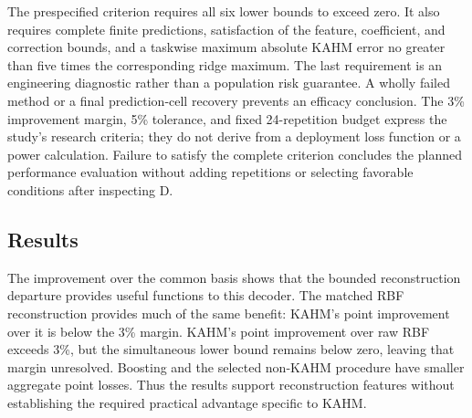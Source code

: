The prespecified criterion requires all six lower bounds to exceed zero.
It also requires complete finite predictions, satisfaction of the
feature, coefficient, and correction bounds, and a taskwise maximum
absolute KAHM error no greater than five times the corresponding ridge
maximum. The last requirement is an engineering diagnostic rather than
a population risk guarantee. A wholly failed method or a final
prediction-cell recovery prevents an efficacy conclusion. The 3\%
improvement margin, 5\% tolerance, and fixed 24-repetition budget express
the study's research criteria; they do not derive from a deployment loss
function or a power calculation. Failure to satisfy the complete criterion
concludes the planned performance evaluation without adding repetitions
or selecting favorable conditions after inspecting D.

\subsection{Results}



\begin{table}[t]
\centering\small
\setlength{\tabcolsep}{3.5pt}
\caption{The six primary comparisons for bounded KAHM departure.
$L_K$ and $L_m$ are losses averaged over repetitions. The first five rows
use the nonlinear aggregate and $\bar d=0.97L_m-L_K$; the last uses
the linear aggregate and $\bar d=1.05L_m-L_K$. Gain is
$100(1-L_K/L_m)$, so negative values favor the comparator. The lower
bound concerns the absolute margin contrast, not the percentage gain.
All bounds use 24 independent repetitions, 23 degrees of freedom, and
a one-sided Bonferroni adjustment for six comparisons. A criterion is
satisfied only when its lower bound is positive.}
\label{tab:mechanism-primary}

\end{table}

The improvement over the common basis shows that the bounded
reconstruction departure provides useful functions to this decoder.
The matched RBF reconstruction provides much of the same benefit:
KAHM's point improvement over it is below the 3\% margin. KAHM's
point improvement over raw RBF exceeds 3\%, but the simultaneous lower
bound remains below zero, leaving that margin unresolved. Boosting and
the selected non-KAHM procedure have smaller aggregate point losses.
Thus the results support reconstruction features without establishing
the required practical advantage specific to KAHM.

